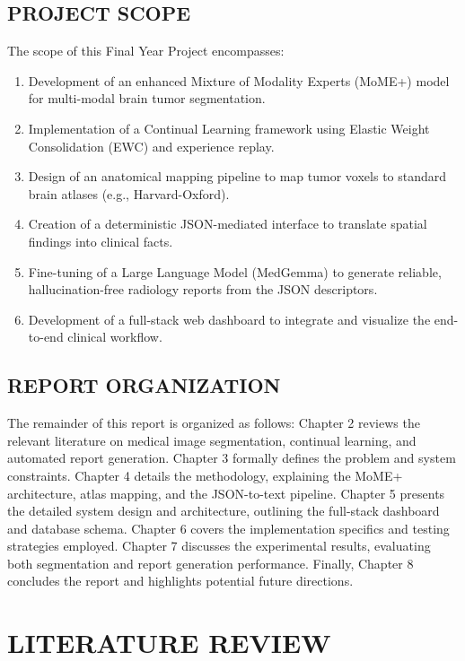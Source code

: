 \documentclass[12pt, a4paper]{report}
\begin{document}
\section{PROJECT SCOPE}
The scope of this Final Year Project encompasses:
\begin{enumerate}
    \item Development of an enhanced Mixture of Modality Experts (MoME+) model for multi-modal brain tumor segmentation.
    \item Implementation of a Continual Learning framework using Elastic Weight Consolidation (EWC) and experience replay.
    \item Design of an anatomical mapping pipeline to map tumor voxels to standard brain atlases (e.g., Harvard-Oxford).
    \item Creation of a deterministic JSON-mediated interface to translate spatial findings into clinical facts.
    \item Fine-tuning of a Large Language Model (MedGemma) to generate reliable, hallucination-free radiology reports from the JSON descriptors.
    \item Development of a full-stack web dashboard to integrate and visualize the end-to-end clinical workflow.
\end{enumerate}

\section{REPORT ORGANIZATION}
The remainder of this report is organized as follows:
Chapter 2 reviews the relevant literature on medical image segmentation, continual learning, and automated report generation.
Chapter 3 formally defines the problem and system constraints.
Chapter 4 details the methodology, explaining the MoME+ architecture, atlas mapping, and the JSON-to-text pipeline.
Chapter 5 presents the detailed system design and architecture, outlining the full-stack dashboard and database schema.
Chapter 6 covers the implementation specifics and testing strategies employed.
Chapter 7 discusses the experimental results, evaluating both segmentation and report generation performance.
Finally, Chapter 8 concludes the report and highlights potential future directions.

\chapter{LITERATURE REVIEW}
\end{document}
